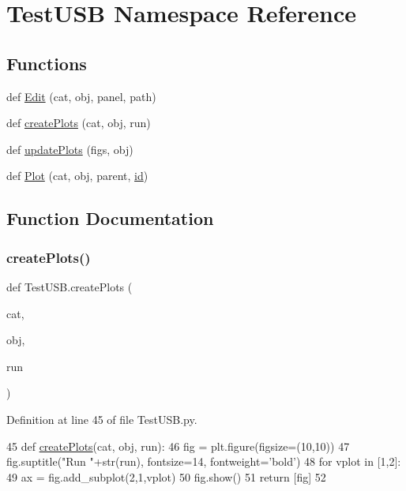 \hypertarget{namespaceTestUSB}{}\section{Test\+U\+SB Namespace Reference}
\label{namespaceTestUSB}
\subsection*{Functions}
\begin{DoxyCompactItemize}
\item 
def \hyperlink{namespaceTestUSB_a5ac50521a0047976653a8b8783d3c346}{Edit} (cat, obj, panel, path)
\item 
def \hyperlink{namespaceTestUSB_af66fa28368bc9d14d6e07b01ea2ff6d3}{create\+Plots} (cat, obj, run)
\item 
def \hyperlink{namespaceTestUSB_aa46663c366817be094cc2fd11bf14c64}{update\+Plots} (figs, obj)
\item 
def \hyperlink{namespaceTestUSB_addf95447225d96da0174da67621d6491}{Plot} (cat, obj, parent, \hyperlink{classObject_af99145335cc61ff6e2798ea17db009d2}{id})
\end{DoxyCompactItemize}


\subsection{Function Documentation}
\mbox{\label{namespaceTestUSB_af66fa28368bc9d14d6e07b01ea2ff6d3}} 
\subsubsection{\texorpdfstring{create\+Plots()}{createPlots()}}
{\footnotesize\ttfamily def Test\+U\+S\+B.\+create\+Plots (\begin{DoxyParamCaption}\item[{}]{cat,  }\item[{}]{obj,  }\item[{}]{run }\end{DoxyParamCaption})}



Definition at line 45 of file Test\+U\+S\+B.\+py.


\begin{DoxyCode}
45 \textcolor{keyword}{def }\hyperlink{namespaceTestUSB_af66fa28368bc9d14d6e07b01ea2ff6d3}{createPlots}(cat, obj, run):
46     fig = plt.figure(figsize=(10,10))
47     fig.suptitle(\textcolor{stringliteral}{"Run "}+str(run), fontsize=14, fontweight=\textcolor{stringliteral}{'bold'})
48     \textcolor{keywordflow}{for} vplot \textcolor{keywordflow}{in} [1,2]:
49         ax = fig.add\_subplot(2,1,vplot)
50     fig.show()    
51     \textcolor{keywordflow}{return} [fig]
52 
\end{DoxyCode}
\mbox{\label{namespaceTestUSB_a5ac50521a0047976653a8b8783d3c346}} 
